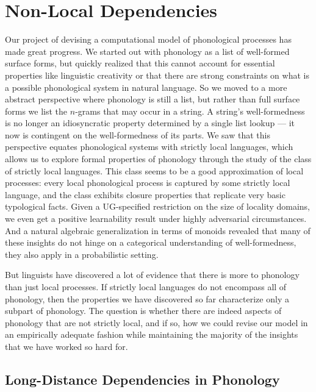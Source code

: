 \chapter{Non-Local Dependencies}
\label{cha:SP}

Our project of devising a computational model of phonological processes has made great progress.
We started out with phonology as a list of well-formed surface forms, but quickly realized that this cannot account for essential properties like linguistic creativity or that there are strong constraints on what is a possible phonological system in natural language.
So we moved to a more abstract perspective where phonology is still a list, but rather than full surface forms we list the $n$-grams that may occur in a string.
A string's well-formedness is no longer an idiosyncratic property determined by a single list lookup --- it now is contingent on the well-formedness of its parts.
We saw that this perspective equates phonological systems with strictly local languages, which allows us to explore formal properties of phonology through the study of the class of strictly local languages.
This class seems to be a good approximation of local processes: every local phonological process is captured by some strictly local language, and the class exhibits closure properties that replicate very basic typological facts.
Given a UG-specified restriction on the size of locality domains, we even get a positive learnability result under highly adversarial circumstances.
And a natural algebraic generalization in terms of monoids revealed that many of these insights do not hinge on a categorical understanding of well-formedness, they also apply in a probabilistic setting.

But linguists have discovered a lot of evidence that there is more to phonology than just local processes.
If strictly local languages do not encompass all of phonology, then the properties we have discovered so far characterize only a subpart of phonology.
The question is whether there are indeed aspects of phonology that are not strictly local, and if so, how we could revise our model in an empirically adequate fashion while maintaining the majority of the insights that we have worked so hard for.

\section{Long-Distance Dependencies in Phonology}

